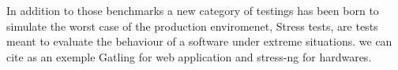 In addition to those benchmarks a new category of testings has been born to simulate the worst case of the production enviromenet, Stress tests, are tests meant to evaluate the behaviour of a software under extreme situations.
we can cite as an exemple Gatling for web application and stress-ng for hardwares.



